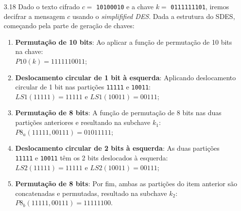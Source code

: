 \documentclass{article}
\begin{document}
\begin{enumerate}
    \item[3.18] Dado o texto cifrado $c =$ \texttt{10100010} e a chave $k =$
        \texttt{0111111101}, iremos decifrar a mensagem $c$ usando o
        \textit{simplifified DES}. Dada a estrutura do SDES, começando pela
        parte de geração de chaves:
    
    \begin{enumerate}
        \item \textbf{Permutação de 10 bits}: Ao aplicar a função de permutação
            de 10 bits na chave: \\
        $P10(k) = 1111110011$;
        \item \textbf{Deslocamento circular de 1 bit à esquerda}: Aplicando
            deslocamento circular de 1 bit nas partições \texttt{11111} e
            \texttt{10011}: \\
        $LS1(11111) = 11111$ e $LS1(10011) = 00111$;
        \item \textbf{Permutação de 8 bits}: A função de permutação de 8 bits
            nas duas partições anteriores e resultando na subchave $k_{1}$: \\
        $P8_{a}(11111, 00111) = 01011111$;
        \item \textbf{Deslocamento circular de 2 bits à esquerda}: As duas
            partições \texttt{11111} e \texttt{10011} têm os 2 bits deslocados
            à esquerda: \\
        $LS2(11111) = 11111$ e $LS2(10011) = 00111$;
        \item \textbf{Permutação de 8 bits}: Por fim, ambas as partições do
            item anterior são concatenadas e permutadas, resultado na subchave
            $k_{2}$: \\
        $P8_{b}(11111, 00111) = 11111100$.
    \end{enumerate}
    

\end{enumerate}
\end{document}
